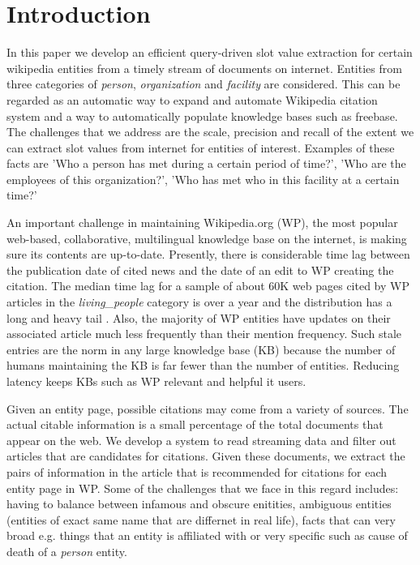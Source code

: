 
\section{Introduction}

In this paper we develop an efficient query-driven slot value extraction for certain wikipedia entities from a timely stream of documents on internet. Entities from three categories of \textit{person}, \textit{organization} and \textit{facility} are considered. This can be regarded as an automatic way to expand and automate Wikipedia citation system and a way to automatically populate knowledge bases such as freebase. The challenges that we address are the scale, precision and recall of the extent we can extract slot values from internet for entities of interest. Examples of these facts are 'Who a person has met during a certain period of time?', 'Who are the employees of this organization?', 'Who has met who in this facility at a certain time?'

 An important challenge in maintaining Wikipedia.org (WP), the most popular web-based, collaborative, multilingual knowledge base on the internet, is making sure its contents are up-to-date. Presently, there is considerable time lag between the publication date of cited news and the date of an edit to WP creating the citation. The median time lag for a sample of about 60K web pages cited by WP articles in the \textit{living\_people} category is over a year and the distribution has a long and heavy tail \cite{JFrank12}. Also, the majority of WP entities have updates on their associated article much less frequently than their mention frequency. Such stale entries are the norm in any large knowledge base (KB) because the number of humans maintaining the KB is far fewer than the number of entities. %
Reducing latency keeps KBs such as WP relevant and helpful it users.

Given an entity page, possible citations may come from a variety of sources. The actual citable information is a small percentage of the total documents that appear on the web. We develop a system to read streaming data and filter out articles that are candidates for citations. Given these documents, we extract the pairs of information in the article that is recommended for citations for each entity page in  WP. Some of the challenges that we face in this regard includes: having to balance between infamous and obscure enitities, ambiguous entities (entities of exact same name that are differnet in real life), facts that can very broad e.g. things that an entity is affiliated with or very specific such as cause of death of a \textit{person} entity.

